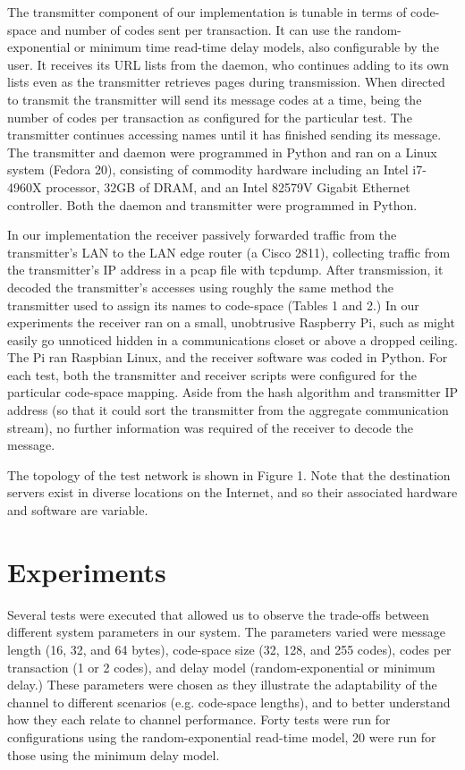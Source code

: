 \documentclass[10pt, conference]{IEEEtran}
\begin{document}
The transmitter component of our implementation is tunable in terms of code-space and number of codes sent per transaction.  It can use the random-exponential or minimum time read-time delay models, also configurable by the user. It receives its URL lists from the daemon, who continues adding to its own lists even as the transmitter retrieves pages during transmission.  When directed to transmit the transmitter will send its message  codes at a time,  being the number of codes per transaction as configured for the particular test.  The transmitter continues accessing names until it has finished sending its message.  The transmitter and daemon were programmed in Python and ran on a Linux system (Fedora 20), consisting of commodity hardware including an Intel i7-4960X processor, 32GB of DRAM, and an Intel 82579V Gigabit Ethernet controller.  Both the daemon and transmitter were programmed in Python.

In our implementation the receiver passively forwarded traffic from the transmitter's LAN to the LAN edge router (a Cisco 2811), collecting traffic from the transmitter's IP address in a pcap file with tcpdump.  After transmission, it decoded the transmitter's accesses using roughly the same method the transmitter used to assign its names to code-space (Tables 1 and 2.)  In our experiments the receiver ran on a small, unobtrusive Raspberry Pi, such as might easily go unnoticed hidden in a communications closet or above a dropped ceiling.  The Pi ran Raspbian Linux, and the receiver software was coded in Python.  For each test, both the transmitter and receiver scripts were configured for the particular code-space mapping.  Aside from the hash algorithm and transmitter IP address (so that it could sort the transmitter from the aggregate communication stream), no further information was required of the receiver to decode the message.

The topology of the test network is shown in Figure 1.  Note that the destination servers exist in diverse locations on the Internet, and so their associated hardware and software are variable.

\vspace{1cm}
\section{Experiments}
Several tests were executed that allowed us to observe the trade-offs between different system parameters in our system.  The parameters varied were message length (16, 32, and 64 bytes), code-space size (32, 128, and 255 codes), codes per transaction (1 or 2 codes), and delay model (random-exponential or minimum delay.)  These parameters were chosen as they illustrate the adaptability of the channel to different scenarios (e.g. code-space lengths), and to better understand how they each relate to channel performance.  Forty tests were run for configurations using the random-exponential read-time model, 20 were run for those using the minimum delay model.
\end{document}
